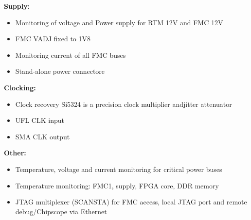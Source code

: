 \textbf{Supply:}

\begin{itemize}
	\item Monitoring of voltage and Power supply for RTM 12V and FMC 12V
	\item FMC VADJ fixed to 1V8
	\item Monitoring current of all FMC buses
	\item Stand-alone power connectore
	
\end{itemize}


\textbf{Clocking:}

\begin{itemize}
	\item Clock recovery Si5324  is a precision clock multiplier andjitter attenuator
	\item UFL CLK input
	\item SMA CLK output
	
	
\end{itemize}


\textbf{Other:}

\begin{itemize}
	\item Temperature, voltage and current monitoring for critical power buses
	\item Temperature monitoring: FMC1, supply, FPGA core, DDR memory
	\item JTAG multiplexer (SCANSTA) for FMC access, local JTAG port and remote debug/Chipscope via Ethernet
	
\end{itemize}

